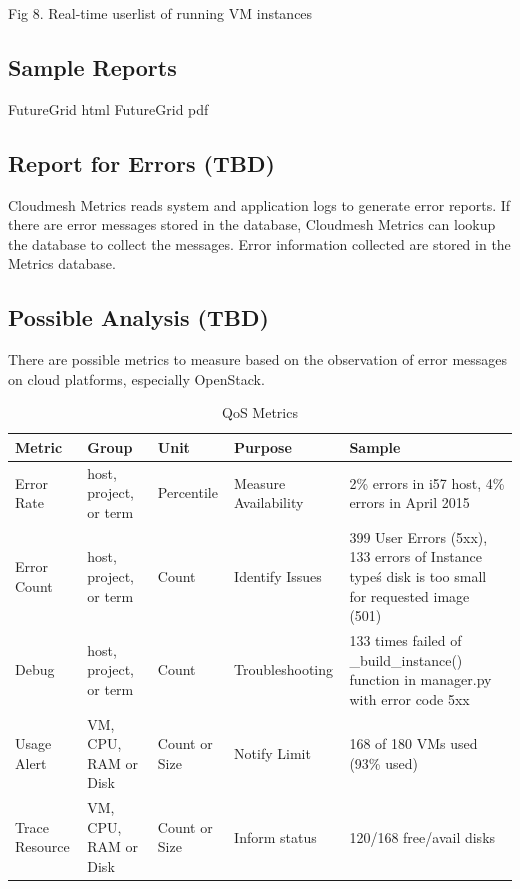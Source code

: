 \documentclass{sig-alternate-05-2015}
\begin{document}
Fig 8. Real-time userlist of running VM instances

\subsection{Sample Reports}

FutureGrid html \cite{LeeFGresourceWeb}
 FutureGrid pdf \cite{LeeFGresource}

\subsection{Report for Errors (TBD)}

Cloudmesh Metrics reads system and application logs to generate error reports. If there are error messages stored in the database, Cloudmesh Metrics can lookup the database to collect the messages. Error information collected are stored in the Metrics database.

\subsection{Possible Analysis (TBD)}

There are possible metrics to measure based on the observation of error messages on cloud platforms, especially OpenStack.

\begin{table}[htb]
\caption{QoS Metrics}
\begin{scriptsize}
\label{T:metrics}
\bigskip
\begin{center}
\begin{tabular}{lp{}p{}p{}p{}}
Metric & Group & Unit & Purpose & Sample \\
\hline
Error Rate &
host, project, or term &
Percentile &
Measure Availability &
2\% errors in i57 host, 4\% errors in April 2015 \\
\hline
Error Count &
host, project, or term &
Count & 
Identify Issues &
399 User Errors (5xx), 133 errors of Instance type\'s disk is too small for requested image (501) \\
\hline
Debug &
host, project, or term &
Count &
Troubleshooting &
133 times failed of \_build\_instance() function in manager.py with error code 5xx \\
\hline
Usage Alert &
VM, CPU, RAM or Disk &
Count or Size &
Notify Limit &
168 of 180 VMs used (93\% used) \\
\hline
Trace Resource  &
VM, CPU, RAM or Disk &
Count or Size &
Inform status &
120/168 free/avail disks \\
\hline
\end{tabular}
\end{center}
\end{scriptsize}
\end{table}
\end{document}

